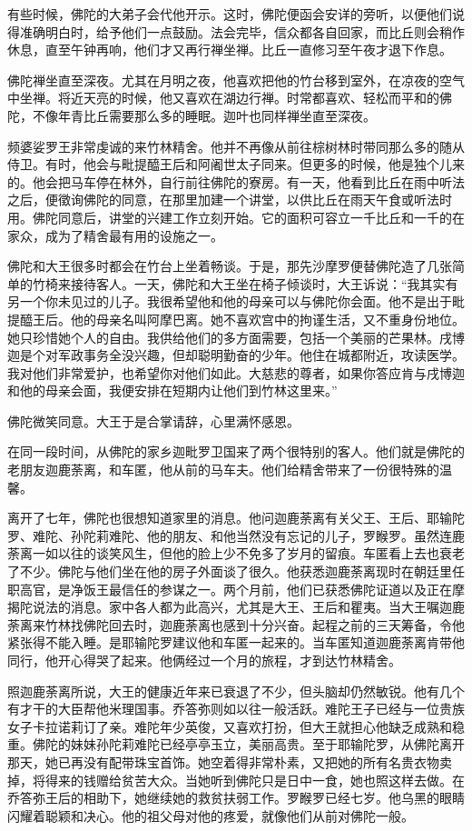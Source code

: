 \documentclass[12pt,twoside,openany]{book}
\begin{document}
有些时候，佛陀的大弟子会代他开示。这时，佛陀便函会安详的旁听，以便他们说得准确明白时，给予他们一点鼓励。法会完毕，信众都各自回家，而比丘则会稍作休息，直至午钟再响，他们才又再行禅坐禅。比丘一直修习至午夜才退下作息。

佛陀禅坐直至深夜。尤其在月明之夜，他喜欢把他的竹台移到室外，在凉夜的空气中坐禅。将近天亮的时候，他又喜欢在湖边行禅。时常都喜欢、轻松而平和的佛陀，不像年青比丘需要那么多的睡眠。迦叶也同样禅坐直至深夜。

频婆娑罗王非常虔诚的来竹林精舍。他并不再像从前往棕树林时带同那么多的随从侍卫。有时，他会与毗提醯王后和阿阇世太子同来。但更多的时候，他是独个儿来的。他会把马车停在林外，自行前往佛陀的寮房。有一天，他看到比丘在雨中听法之后，便徵询佛陀的同意，在那里加建一个讲堂，以供比丘在雨天午食或听法时用。佛陀同意后，讲堂的兴建工作立刻开始。它的面积可容立一千比丘和一千的在家众，成为了精舍最有用的设施之一。

佛陀和大王很多时都会在竹台上坐着畅谈。于是，那先沙摩罗便替佛陀造了几张简单的竹椅来接待客人。一天，佛陀和大王坐在椅子倾谈时，大王诉说：“我其实有另一个你未见过的儿子。我很希望他和他的母亲可以与佛陀你会面。他不是出于毗提醯王后。他的母亲名叫阿摩巴离。她不喜欢宫中的拘谨生活，又不重身份地位。她只珍惜她个人的自由。我供给他们的多方面需要，包括一个美丽的芒果林。戌博迦是个对军政事务全没兴趣，但却聪明勤奋的少年。他住在城都附近，攻读医学。我对他们非常爱护，也希望你对他们如此。大慈悲的尊者，如果你答应肯与戌博迦和他的母亲会面，我便安排在短期内让他们到竹林这里来。”

佛陀微笑同意。大王于是合掌请辞，心里满怀感恩。

在同一段时间，从佛陀的家乡迦毗罗卫国来了两个很特别的客人。他们就是佛陀的老朋友迦鹿荼离，和车匿，他从前的马车夫。他们给精舍带来了一份很特殊的温馨。

离开了七年，佛陀也很想知道家里的消息。他问迦鹿荼离有关父王、王后、耶输陀罗、难陀、孙陀莉难陀、他的朋友、和他当然没有忘记的儿子，罗睺罗。虽然连鹿荼离一如以往的谈笑风生，但他的脸上少不免多了岁月的留痕。车匿看上去也衰老了不少。佛陀与他们坐在他的房子外面谈了很久。他获悉迦鹿荼离现时在朝廷里任职高官，是净饭王最信任的参谋之一。两个月前，他们已获悉佛陀证道以及正在摩揭陀说法的消息。家中各人都为此高兴，尤其是大王、王后和瞿夷。当大王嘱迦鹿荼离来竹林找佛陀回去时，迦鹿荼离也感到十分兴奋。起程之前的三天筹备，令他紧张得不能入睡。是耶输陀罗建议他和车匿一起来的。当车匿知道迦鹿荼离肯带他同行，他开心得哭了起来。他俩经过一个月的旅程，才到达竹林精舍。

照迦鹿荼离所说，大王的健康近年来已衰退了不少，但头脑却仍然敏锐。他有几个有才干的大臣帮他米理国事。乔答弥则如以往一般活跃。难陀王子已经与一位贵族女子卡拉诺莉订了亲。难陀年少英俊，又喜欢打扮，但大王就担心他缺乏成熟和稳重。佛陀的妹妹孙陀莉难陀已经亭亭玉立，美丽高贵。至于耶输陀罗，从佛陀离开那天，她已再没有配带珠宝首饰。她空着得非常朴素，又把她的所有名贵衣物卖掉，将得来的钱赠给贫苦大众。当她听到佛陀只是日中一食，她也照这样去做。在乔答弥王后的相助下，她继续她的救贫扶弱工作。罗睺罗已经七岁。他乌黑的眼睛闪耀着聪颖和决心。他的祖父母对他的疼爱，就像他们从前对佛陀一般。
\end{document}
